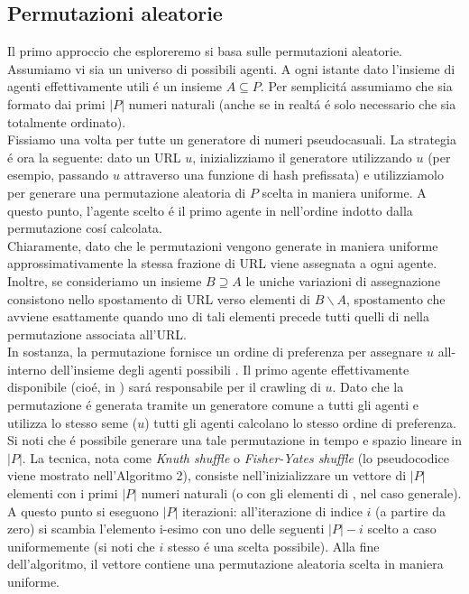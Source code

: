 \subsection{Permutazioni aleatorie}
Il primo approccio che esploreremo si basa sulle permutazioni aleatorie. Assumiamo vi sia un universo  di possibili agenti. A ogni istante dato l'insieme di agenti effettivamente utili é un insieme $A \subseteq P$. Per semplicitá assumiamo che  sia formato dai primi $|P|$ numeri naturali (anche se in realtá é solo necessario che  sia totalmente ordinato).\\
Fissiamo una volta per tutte un generatore di numeri pseudocasuali. La strategia é ora la seguente: dato un URL $u$, inizializziamo il generatore utilizzando $u$ (per esempio, passando $u$ attraverso una funzione di hash prefissata) e utilizziamolo per generare una permutazione aleatoria di $P$ scelta in maniera uniforme. A questo punto, l'agente scelto é il primo agente in  nell'ordine indotto dalla permutazione cosí calcolata.\\
Chiaramente, dato che le permutazioni vengono generate in maniera uniforme approssimativamente la stessa frazione di URL viene assegnata a ogni agente. Inoltre, se consideriamo un insieme $B \supseteq A$ le uniche variazioni di assegnazione consistono nello spostamento di URL verso elementi di $B \smallsetminus A$, spostamento che avviene esattamente quando uno di tali elementi precede tutti quelli di  nella permutazione associata all'URL.\\
In sostanza, la permutazione fornisce un ordine di preferenza per assegnare $u$ all-interno dell'insieme degli agenti possibili . Il primo agente effettivamente disponibile (cioé, in ) sará responsabile per il crawling di $u$. Dato che la permutazione é generata tramite un generatore comune a tutti gli agenti e utilizza lo stesso seme ($u$) tutti gli agenti calcolano lo stesso ordine di preferenza.\\
Si noti che é possibile generare una tale permutazione in tempo e spazio lineare in $|P|$. La tecnica, nota come \textit{Knuth shuffle} o \textit{Fisher-Yates shuffle} (lo pseudocodice viene mostrato nell'Algoritmo 2), consiste nell'inizializzare un vettore di $|P|$ elementi con i primi $|P|$ numeri naturali (o con gli elementi di , nel caso generale).\\
A questo punto si eseguono $|P|$ iterazioni: all'iterazione di indice $i$ (a partire da zero) si scambia l'elemento i-esimo con uno delle seguenti $|P| - i$ scelto a caso uniformemente (si noti che $i$ stesso é una scelta possibile). Alla fine dell'algoritmo, il vettore contiene una permutazione aleatoria scelta in maniera uniforme.
